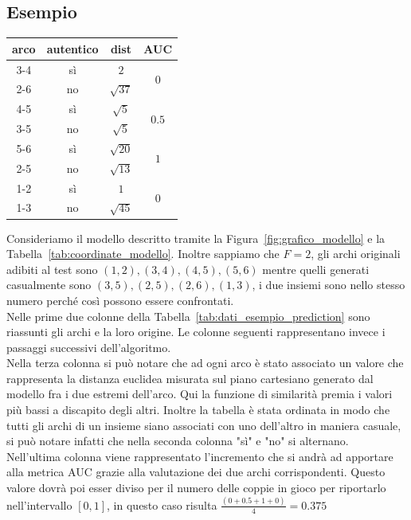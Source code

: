 \subsection{Esempio}
\begin{center}
	\begin{tabular}{|c|c|c|c|}
		\hline
		arco & autentico & dist & AUC\\
		\hline
		3-4 & sì & $2$ & \multirow{2}{*}{$0$}\\
		2-6 & no & $\sqrt{37}$ & \\
		\hline
		4-5 & sì & $\sqrt{5}$ & \multirow{2}{*}{$0.5$}\\
		3-5 & no & $\sqrt{5}$ & \\
		\hline
		5-6 & sì & $\sqrt{20}$ & \multirow{2}{*}{$1$}\\
		2-5 & no & $\sqrt{13}$ & \\
		\hline
		1-2 & sì & $1$ & \multirow{2}{*}{$0$}\\
		1-3 & no & $\sqrt{45}$ & \\
		\hline
	\end{tabular}
	\label{tab:dati_esempio_prediction}
\end{center}
Consideriamo il modello descritto tramite la Figura~\ref{fig:grafico_modello} e la Tabella~\ref{tab:coordinate_modello}. Inoltre sappiamo che $F=2$, gli archi originali adibiti al test sono $(1, 2), (3, 4), (4, 5), (5, 6)$ mentre quelli generati casualmente sono $(3, 5), (2, 5), (2, 6), (1, 3)$, i due insiemi sono nello stesso numero perché così possono essere confrontati.\\
Nelle prime due colonne della Tabella~\ref{tab:dati_esempio_prediction} sono riassunti gli archi e la loro origine. Le colonne seguenti rappresentano invece i passaggi successivi dell'algoritmo.\\
Nella terza colonna si può notare che ad ogni arco è stato associato un valore che rappresenta la distanza euclidea misurata sul piano cartesiano generato dal modello fra i due estremi dell'arco. Qui la funzione di similarità premia i valori più bassi a discapito degli altri. Inoltre la tabella è stata ordinata in modo che tutti gli archi di un insieme siano associati con uno dell'altro in maniera casuale, si può notare  infatti che nella seconda colonna "sì" e "no" si alternano.\\
Nell'ultima colonna viene rappresentato l'incremento che si andrà ad apportare alla metrica AUC grazie alla valutazione dei due archi corrispondenti. Questo valore dovrà poi esser diviso per il numero delle coppie in gioco per riportarlo nell'intervallo $[0, 1]$, in questo caso risulta $\displaystyle \frac{\left( 0+0.5+1+0 \right)}{4} = 0.375$\\
